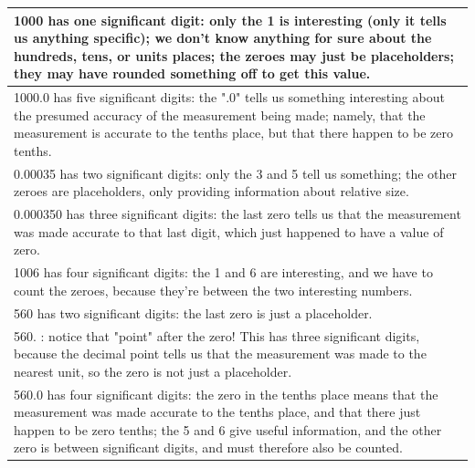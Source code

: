 \documentclass{article}
\begin{document}
\newpage
\begin{table}[h]
\begin{tabular}{|p{16cm}|}
\hline
\scriptsize{1000 has   one significant digit: only the 1 is interesting (only it tells us anything   specific); we don't know anything for sure about the hundreds, tens, or units   places; the zeroes may just be placeholders; they may have rounded something   off to get this value.                                    } \\ \hline
\scriptsize{1000.0 has five significant   digits: the ".0" tells us something interesting about the presumed   accuracy of the measurement being made; namely, that the measurement is   accurate to the tenths place, but that there happen to be zero tenths.                                                               } \\ \hline
\scriptsize{0.00035 has two significant   digits: only the 3 and 5 tell us something; the other zeroes are   placeholders, only providing information about relative size.                                                                                                                                                    } \\ \hline
\scriptsize{0.000350 has three significant   digits: the last zero tells us that the measurement was made accurate to that   last digit, which just happened to have a value of zero.                                                                                                                                         } \\ \hline
\scriptsize{1006 has four significant   digits: the 1 and 6 are interesting, and we have to count the zeroes, because   they're between the two interesting numbers.                                                                                                                                                          } \\ \hline
\scriptsize{560 has two significant   digits: the last zero is just a placeholder.                                                                                                                                                                                                                                            } \\ \hline
\scriptsize{560. : notice that   "point" after the zero! This has three significant digits, because   the decimal point tells us that the measurement was made to the nearest unit,   so the zero is not just a placeholder.                                                                                                  } \\ \hline
\scriptsize{560.0 has four significant   digits: the zero in the tenths place means that the measurement was made   accurate to the tenths place, and that there just happen to be zero tenths;   the 5 and 6 give useful information, and the other zero is between   significant digits, and must therefore also be counted.} \\ \hline
\end{tabular}
\end{table}
\end{document}
